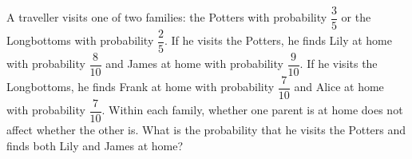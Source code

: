 A traveller visits one of two families: the Potters with probability $\dfrac35$ or the Longbottoms with probability $\dfrac25$. If he visits the Potters, he finds Lily at home with probability $\dfrac{8}{10}$ and James at home with probability $\dfrac{9}{10}$. If he visits the Longbottoms, he finds Frank at home with probability $\dfrac{7}{10}$ and Alice at home with probability $\dfrac{7}{10}$. Within each family, whether one parent is at home does not affect whether the other is. What is the probability that he visits the Potters and finds both Lily and James at home?
